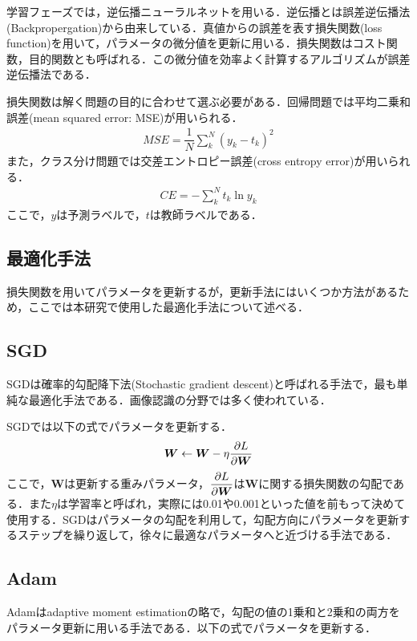 学習フェーズでは，逆伝播ニューラルネットを用いる．逆伝播とは誤差逆伝播法(Backpropergation)\cite{Backprop}から由来している．真値からの誤差を表す損失関数(loss function)を用いて，パラメータの微分値を更新に用いる．損失関数はコスト関数，目的関数とも呼ばれる．この微分値を効率よく計算するアルゴリズムが誤差逆伝播法である．

損失関数は解く問題の目的に合わせて選ぶ必要がある．回帰問題では平均二乗和誤差(mean squared error: MSE)が用いられる．
\begin{align}\label{eq:mse}
	MSE = \dfrac{1}{N} \sum_{k}^N (y_k - t_k)^2
\end{align}
また，クラス分け問題では交差エントロピー誤差(cross entropy error)が用いられる．
\begin{align}\label{eq:crossentropy}
	CE = - \sum_k ^N t_k \ln {y_k}
\end{align}
ここで，$y$は予測ラベルで，$t$は教師ラベルである．


\subsection{最適化手法}
損失関数を用いてパラメータを更新するが，更新手法にはいくつか方法があるため，ここでは本研究で使用した最適化手法について述べる．

\subsection*{SGD}
SGDは確率的勾配降下法(Stochastic gradient descent)と呼ばれる手法で，最も単純な最適化手法である．画像認識の分野では多く使われている．

SGDでは以下の式でパラメータを更新する．
\begin{align}\label{eq:SGD}
	\bm{W} \leftarrow \bm{W} - \eta \dfrac{\partial L}{\partial \bm{W}} 
\end{align}
ここで，$\bm{W}$は更新する重みパラメータ，$\dfrac{\partial L}{\partial \bm{W}}$は$\bm{W}$に関する損失関数の勾配である．また$\eta$は学習率と呼ばれ，実際には0.01や0.001といった値を前もって決めて使用する．SGDはパラメータの勾配を利用して，勾配方向にパラメータを更新するステップを繰り返して，徐々に最適なパラメータへと近づける手法である．

\subsection*{Adam}
Adam\cite{Adam}はadaptive moment estimationの略で，勾配の値の1乗和と2乗和の両方をパラメータ更新に用いる手法である．以下の式でパラメータを更新する．

